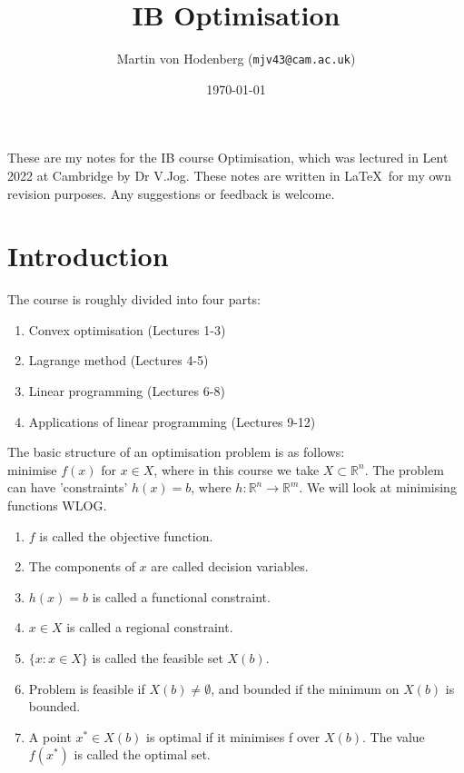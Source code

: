 \documentclass[a4paper]{scrartcl}
\title{IB Optimisation}
\author{Martin von Hodenberg (\texttt{mjv43@cam.ac.uk})}
\date{\today}
\begin{document}
\maketitle

These are my notes for the IB course Optimisation, which was lectured in Lent 2022 at Cambridge by Dr V.Jog. These notes are written in \LaTeX  \ for my own revision purposes. Any suggestions or feedback is welcome.

\tableofcontents
\newpage 

\section{Introduction}

The course is roughly divided into four parts:
\begin{enumerate}
	\item Convex optimisation (Lectures 1-3)
	\item Lagrange method (Lectures 4-5)
	\item Linear programming (Lectures 6-8)
	\item Applications of linear programming (Lectures 9-12)
\end{enumerate}

\begin{definition}
	The basic structure of an optimisation problem is as follows:\\
	minimise $f(x)$ for $x \in X$, where in this course we take $X \subset \mathbb{R}^n$. The problem can have 'constraints' $h(x)=b$, where $h:\mathbb{R}^n \to \mathbb{R}^m$. We will look at minimising functions WLOG.
	
	\begin{enumerate}
		\item $f$ is called the objective function.
		\item The components of $x$ are called decision variables.
		\item $h(x)=b$ is called a functional constraint.
		\item $x \in X$ is called a regional constraint.
		\item $\{x: x \in X\}$ is called the feasible set $X (b) $.
		\item Problem is feasible if $X(b)\neq \emptyset$, and bounded if the minimum on $X(b)$ is bounded.
		\item A point $x^* \in X(b)$ is optimal if it minimises f over $X(b)$. The value $f(x^*)$ is called the optimal set. 
	\end{enumerate}
	
\end{definition}
\end{document}
